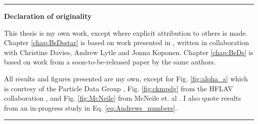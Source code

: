\begin{titlepage}
\begin{vcenterpage}
\noindent\rule[2pt]{\textwidth}{0.5pt}
\begin{center}
{\large\textbf{Declaration of originality}}
\end{center}
This thesis is my own work, except where explicit attribution to others is made. Chapter \ref{chap:BsDsstar} is based on work presented in \cite{McLean:2019sds}, written in collaboration with Christine Davies, Andrew Lytle and Jonna Koponen. Chapter \ref{chap:BsDs} is based on work from a soon-to-be-released paper by the same authors.

All results and figures presented are my own, except for Fig. \ref{fig:alpha_s} which is courtesy of the Particle Data Group \cite{PhysRevD.98.030001}, Fig. \ref{fig:ckmpdg} from the HFLAV collaboration \cite{HFLAV16}, and Fig. \ref{fig:McNeile} from McNeile et. al \cite{McNeile:2012qf}. I also quote results from an in-progress study \cite{Colquhoun:2016osw} in Eq. \eqref{eq:Andrews_numbers}.
    
\noindent\rule[2pt]{\textwidth}{0.5pt}
\end{vcenterpage}

\cleardoublepage

\thispagestyle{empty}


\end{titlepage}
\sloppy

\titlepage
